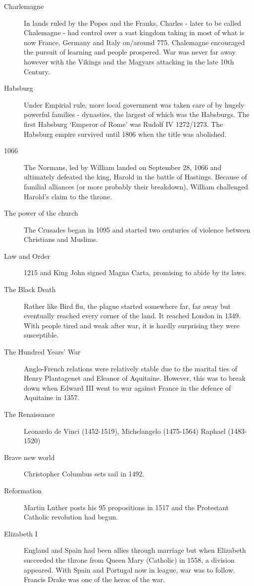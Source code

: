 \begin{description}
\item [Charlemagne] In lands ruled by the Popes and the Franks, Charles - later to be called Chalemagne - had control over a vast kingdom taking in most of what is now France, Germany and Italy on/around 775. Chalemagne encouraged the pursuit of learning and people prospered. War was never far away however with the Vikings and the Magyars attacking in the late 10th Century. 
\item [Habsburg] Under Empirial rule, more local government was taken care of by hugely powerful families - dynasties, the largest of which was the Habsburgs. The first Habsburg `Emperor of Rome' was Rudolf IV 1272/1273. The Habsburg empire survived until 1806 when the title was abolished. 
\item [1066] The Normans, led by William landed on September 28, 1066 and ultimately defeated the king, Harold in the battle of Hastings. Because of familial alliances (or more probably their breakdown), William challenged Harold's claim to the throne. 
\item [The power of the church] The Crusades began in 1095 and started two centuries of violence between Christians and Muslims. 
\item [Law and Order] 1215 and King John signed Magna Carta, promising to abide by its laws. 
\item [The Black Death] Rather like Bird flu, the plague started somewhere far, far away but eventually reached every corner of the land. It reached London in 1349. With people tired and weak after war, it is hardly surprising they were susceptible. 
\item [The Hundred Years' War] Anglo-French relations were relatively stable due to the marital ties of Henry Plantagenet and Eleanor of Aquitaine. However, this was to break down when Edward III went to war against France in the defence of Aquitaine in 1357. 
\item [The Renaissance] Leonardo de Vinci (1452-1519), Michelangelo (1475-1564) Raphael (1483-1520) 
\item [Brave new world] Christopher Columbus sets sail in 1492. 
\item [Reformation] Martin Luther posts his 95 propositions in 1517 and the Protestant Catholic revolution had begun. 
\item [Elizabeth I] England and Spain had been allies through marriage but when Elizabeth succeeded the throne from Queen Mary (Catholic) in 1558, a division appeared. With Spain and Portugal now in league, war was to follow. Francis Drake was one of the heros of the war. 

\end{description}
